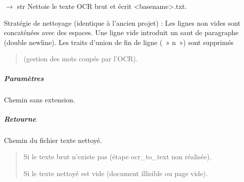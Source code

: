 \documentclass[letterpaper,10pt,french]{sphinxmanual}
\begin{document}
\begin{fulllineitems}

\begin{fulllineitems}
\label{\detokenize{api/hardware.devices:hardware.devices.text_reader_device.TextReaderDevice.clean_text}}
\pysigstartsignatures
\pysiglinewithargsret
{}
{}
{{ $\rightarrow$ str}}
\pysigstopsignatures
\sphinxAtStartPar
Nettoie le texte OCR brut et écrit \textless{}basename\textgreater{}.txt.

\sphinxAtStartPar
Stratégie de nettoyage (identique à l’ancien projet) :
\sphinxhyphen{} Les lignes non vides sont concaténées avec des espaces.
\sphinxhyphen{} Une ligne vide introduit un saut de paragraphe (double newline).
\sphinxhyphen{} Les traits d’union de fin de ligne ( »\sphinxhyphen{} n ») sont supprimés
\begin{quote}

\sphinxAtStartPar
(gestion des mots coupés par l’OCR).
\end{quote}


\subparagraph{Paramètres}
\label{\detokenize{api/hardware.devices:id11}}\begin{description}
\sphinxAtStartPar
Chemin sans extension.

\end{description}


\subparagraph{Retourne}
\label{\detokenize{api/hardware.devices:id12}}\begin{description}
\sphinxAtStartPar
Chemin du fichier texte nettoyé.

\end{description}
\begin{quote}\begin{description}
\sphinxAtStartPar
Si le texte brut n’existe pas (étape ocr\_to\_text non réalisée).

\sphinxAtStartPar
Si le texte nettoyé est vide (document illisible ou page vide).

\end{description}\end{quote}

\end{fulllineitems}


\end{fulllineitems}
\end{document}
